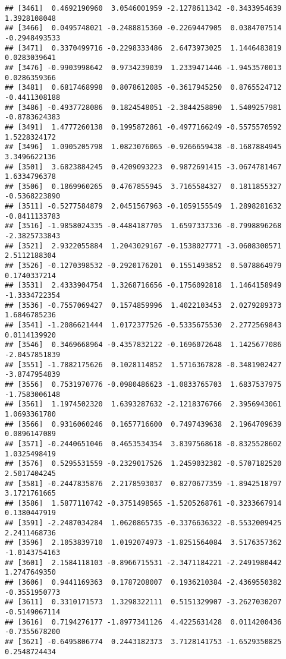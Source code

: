 \documentclass[
]{article}
\begin{document}
\begin{verbatim}
## [3461]  0.4692190960  3.0546001959 -2.1278611342 -0.3433954639  1.3928108048
## [3466]  0.0495748021 -0.2488815360 -0.2269447905  0.0384707514 -0.2948493533
## [3471]  0.3370499716 -0.2298333486  2.6473973025  1.1446483819  0.0283039641
## [3476] -0.9903998642  0.9734239039  1.2339471446 -1.9453570013  0.0286359366
## [3481]  0.6817468998  0.8078612085 -0.3617945250  0.8765524712 -0.4411308188
## [3486] -0.4937728086  0.1824548051 -2.3844258890  1.5409257981 -0.8783624383
## [3491]  1.4777260138  0.1995872861 -0.4977166249 -0.5575570592  1.5228324172
## [3496]  1.0905205798  1.0823076065 -0.9266659438 -0.1687884945  3.3496622136
## [3501]  3.6823884245  0.4209093223  0.9872691415 -3.0674781467  1.6334796378
## [3506]  0.1869960265  0.4767855945  3.7165584327  0.1811855327 -0.5368223890
## [3511] -0.5277584879  2.0451567963 -0.1059155549  1.2898281632 -0.8411133783
## [3516] -1.9858024335 -0.4484187705  1.6597337336 -0.7998896268 -2.3825733843
## [3521]  2.9322055884  1.2043029167 -0.1538027771 -3.0608300571  2.5112188304
## [3526] -0.1270398532 -0.2920176201  0.1551493852  0.5078864979  0.1740337214
## [3531]  2.4333904754  1.3268716656 -0.1756092818  1.1464158949 -1.3334722354
## [3536] -0.7557069427  0.1574859996  1.4022103453  2.0279289373  1.6846785236
## [3541] -1.2086621444  1.0172377526 -0.5335675530  2.2772569843  0.0114139920
## [3546]  0.3469668964 -0.4357832122 -0.1696072648  1.1425677086 -2.0457851839
## [3551] -1.7882175626  0.1028114852  1.5716367828 -0.3481902427 -3.8747954839
## [3556]  0.7531970776 -0.0980486623 -1.0833765703  1.6837537975 -1.7583006148
## [3561]  1.1974502320  1.6393287632 -2.1218376766  2.3956943061  1.0693361780
## [3566]  0.9316060246  0.1657716600  0.7497439638  2.1964709639  0.0896147089
## [3571] -0.2440651046  0.4653534354  3.8397568618 -0.8325528602  1.0325498419
## [3576]  0.5295531559 -0.2329017526  1.2459032382 -0.5707182520  2.5017404245
## [3581] -0.2447835876  2.2178593037  0.8270677359 -1.8942518797  3.1721761665
## [3586]  1.5877110742 -0.3751498565 -1.5205268761 -0.3233667914  0.1380447919
## [3591] -2.2487034284  1.0620865735 -0.3376636322 -0.5532009425  2.2411468736
## [3596]  2.1053839710  1.0192074973 -1.8251564084  3.5176357362 -1.0143754163
## [3601]  2.1584118103 -0.8966715531 -2.3471184221 -2.2491980442  1.2747649350
## [3606]  0.9441169363  0.1787208007  0.1936210384 -2.4369550382 -0.3551950773
## [3611]  0.3310171573  1.3298322111  0.5151329907 -3.2627030207 -0.5149067114
## [3616]  0.7194276177 -1.8977341126  4.4225631428  0.0114200436 -0.7355678200
## [3621] -0.6495806774  0.2443182373  3.7128141753 -1.6529350825  0.2548724434

\end{verbatim}
\end{document}
